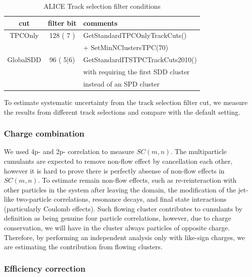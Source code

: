 \begin{table}[!h]
\begin{center}
\begin{tabular}{c|c|l}
\hline
cut		  & filter bit    & comments \\ \hline
TPCOnly   & 128 ( 7 )     & GetStandardTPCOnlyTrackCuts() \\
	      &               & + SetMinNClustersTPC(70)\\ \hline
GlobalSDD & 96  ( 5$|$6)  & GetStandardITSTPCTrackCuts2010()  \\ 
	      &               & with requiring the first SDD cluster \\ 
	      &               & instead of an SPD cluster \\ \hline
\end{tabular}
\caption{ALICE Track selection filter conditions}
\end{center}
\end{table}

To estimate systematic uncertainty from the track selection filter cut, we measure the results from different track selections and compare with the default setting.
	
	
\subsubsection{Charge combination}

We used 4p- and 2p- correlation to measure $SC(m,n)$. The multiparticle cumulants are expected to remove non-flow effect by cancellation each other, however it is hard to prove there is perfectly absense of non-flow effects in $SC(m,n)$. To estimate remain non-flow effects, such as re-reinteraction with other particles in the system after leaving the domain, the modification of the jet-like two-particle correlations, resonance decays, and final state interactions (particularly Coulomb effects).  Such flowing cluster contributes to cumulants by definition as being genuine four particle correlations, however, due to charge conservation, we will have in the cluster always particles of opposite charge. Therefore, by performing an independent analysis only with like-sign charges, we are estimating the contribution from flowing clusters. 



\subsubsection{Efficiency correction}

